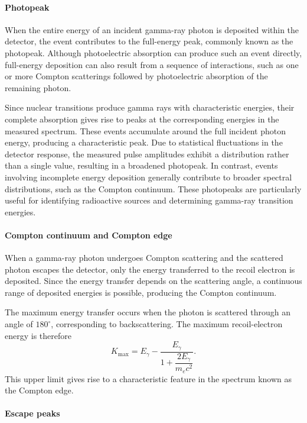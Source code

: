 \paragraph{Photopeak}

When the entire energy of an incident gamma-ray photon is deposited within the detector, the event contributes to the full-energy peak, commonly known as the photopeak. Although photoelectric absorption can produce such an event directly, full-energy deposition can also result from a sequence of interactions, such as one or more Compton scatterings followed by photoelectric absorption of the remaining photon.

Since nuclear transitions produce gamma rays with characteristic energies, their complete absorption gives rise to peaks at the corresponding energies in the measured spectrum. These events accumulate around the full incident photon energy, producing a characteristic peak. Due to statistical fluctuations in the detector response, the measured pulse amplitudes exhibit a distribution rather than a single value, resulting in a broadened photopeak. In contrast, events involving incomplete energy deposition generally contribute to broader spectral distributions, such as the Compton continuum. These photopeaks are particularly useful for identifying radioactive sources and determining gamma-ray transition energies.

\paragraph{Compton continuum and Compton edge}

When a gamma-ray photon undergoes Compton scattering and the scattered photon escapes the detector, only the energy transferred to the recoil electron is deposited. Since the energy transfer depends on the scattering angle, a continuous range of deposited energies is possible, producing the Compton continuum.

The maximum energy transfer occurs when the photon is scattered through an angle of $180^\circ$, corresponding to backscattering. The maximum recoil-electron energy is therefore
\begin{equation}
    K_{\mathrm{max}} =
    E_\gamma-
    \frac{E_\gamma}
    {1+\dfrac{2E_\gamma}{m_ec^2}}.
\end{equation}
This upper limit gives rise to a characteristic feature in the spectrum known as the Compton edge.

\paragraph{Escape peaks}


